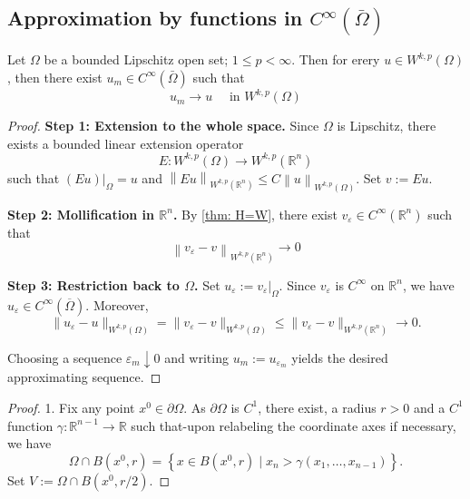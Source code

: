 \subsection{Approximation by functions in $C^{\infty}(\bar{\Omega})$}

\begin{theorem}
    \label{thm: Approximation by functions smooth up to the boundary}
    Let $\Omega$ be a bounded Lipschitz open set; $1\leq p <\infty$.
    Then for erery $u \in W^{k, p}\left(\Omega\right)$, then there exist $u_m \in C^{\infty}(\bar{\Omega})$ such that
    \begin{equation*}
        u_m \rightarrow u \quad \text { in } W^{k, p}\left(\Omega\right)
    \end{equation*}
    \begin{proof}
        \textbf{Step 1: Extension to the whole space.}
        Since $\Omega$ is Lipschitz, there exists a bounded linear extension
        operator
        \[
            E:W^{k,p}(\Omega)\to W^{k,p}(\mathbb R^n)
        \]
        such that $(Eu)|_\Omega=u$ and
        $\left\|Eu\right\|_{W^{k,p}(\mathbb R^n)}\le C\left\|u\right\|_{W^{k,p}(\Omega)}$.
        Set $v:=Eu$.

        \medskip

        \textbf{Step 2: Mollification in $\mathbb R^n$.}
        By \cref{thm: H=W}, there exist $v_\varepsilon \in C^\infty(\mathbb R^n)$ such that
        \[
            \left\|v_\varepsilon-v\right\|_{W^{k,p}(\mathbb R^n)}
            \longrightarrow 0
        \]

        \medskip

        \textbf{Step 3: Restriction back to $\Omega$.}
        Set $u_\varepsilon:=v_\varepsilon|_\Omega$.
        Since $v_\varepsilon$ is $C^\infty$ on $\mathbb R^n$, we have
        $u_\varepsilon\in C^\infty(\overline\Omega)$.
        Moreover,
        \[
            \|u_\varepsilon-u\|_{W^{k,p}(\Omega)}
            =\|v_\varepsilon-v\|_{W^{k,p}(\Omega)}
            \le \|v_\varepsilon-v\|_{W^{k,p}(\mathbb R^n)}
            \longrightarrow 0 .
        \]

        Choosing a sequence $\varepsilon_m\downarrow 0$ and writing
        $u_m:=u_{\varepsilon_m}$ yields the desired approximating sequence.
    \end{proof}
    \begin{proof}
        1. Fix any point $x^0 \in \partial \Omega$. As $\partial \Omega$ is $C^1$, there exist, a radius $r>0$ and a $C^1$ function $\gamma: \mathbb{R}^{n-1} \rightarrow \mathbb{R}$ such that-upon relabeling the coordinate axes if necessary, we have
        $$
            \Omega \cap B\left(x^0, r\right)=\left\{x \in B\left(x^0, r\right) \mid x_n>\gamma\left(x_1, \ldots, x_{n-1}\right)\right\} .
        $$
        Set $V:=\Omega \cap B\left(x^0, r / 2\right)$.


\end{proof}
\end{theorem}
